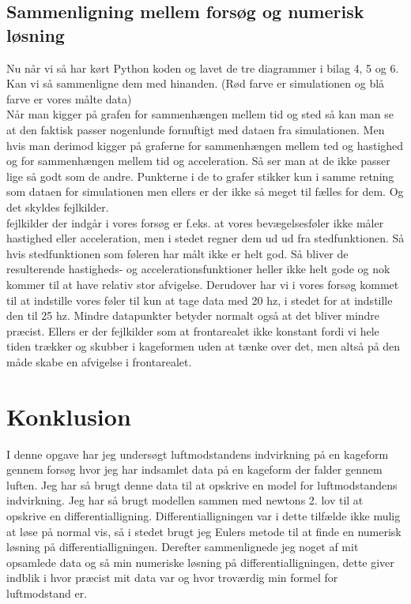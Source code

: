 \documentclass[12pt]{article}
\begin{document}
\subsection{Sammenligning mellem forsøg og numerisk løsning}
Nu når vi så har kørt Python koden og lavet de tre diagrammer i bilag 4, 5 og 6. Kan vi så sammenligne dem med hinanden.
(Rød farve er simulationen og blå farve er vores målte data)\\
Når man kigger på grafen for sammenhængen mellem tid og sted så kan man se at den faktisk passer nogenlunde fornuftigt med dataen fra simulationen.
Men hvis man derimod kigger på graferne for sammenhængen mellem ted og hastighed og for sammenhængen mellem tid og acceleration. Så ser man at de ikke
passer lige så godt som de andre. Punkterne i de to grafer stikker kun i samme retning som dataen for simulationen men ellers er der ikke så meget til fælles for dem.
Og det skyldes fejlkilder.\\
fejlkilder der indgår i vores forsøg er f.eks. at vores bevægelsesføler ikke måler hastighed eller acceleration, men i stedet regner dem ud ud fra stedfunktionen.
Så hvis stedfunktionen som føleren har målt ikke er helt god. Så bliver de resulterende hastigheds- og accelerationsfunktioner heller ikke helt gode og nok kommer til
at have relativ stor afvigelse. Derudover har vi i vores forsøg kommet til at indstille vores føler til kun at tage data med 20 hz, i stedet for at indstille den til
25 hz. Mindre datapunkter betyder normalt også at det bliver mindre præcist. Ellers er der fejlkilder som at frontarealet ikke konstant fordi vi hele tiden trækker og
skubber i kageformen uden at tænke over det, men altså på den måde skabe en afvigelse i frontarealet.

\section{Konklusion}
I denne opgave har jeg undersøgt luftmodstandens indvirkning på en kageform gennem forsøg
hvor jeg har indsamlet data på en kageform der falder gennem luften. Jeg har så
brugt denne data til at opskrive en model for luftmodstandens indvirkning. Jeg har så
brugt modellen sammen med newtons 2. lov til at opskrive en differentialligning.
Differentialligningen var i dette tilfælde ikke mulig at løse på normal vis, så
i stedet brugt jeg Eulers metode til at finde en numerisk løsning på
differentialligningen. Derefter sammenlignede jeg noget af mit opsamlede data
og så min numeriske løsning på differentialligningen, dette giver indblik i hvor
præcist mit data var og hvor troværdig min formel for luftmodstand er.
\end{document}
